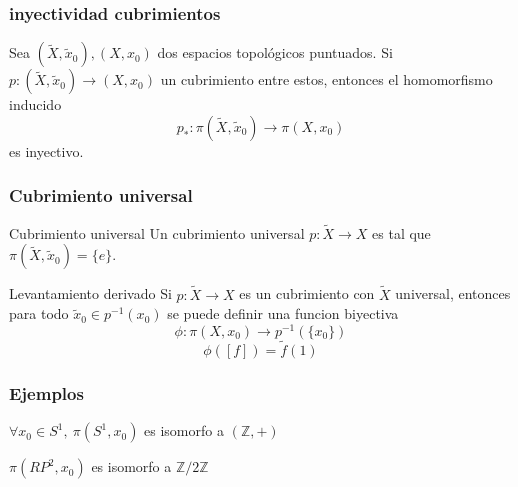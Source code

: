 \documentclass[xetex,mathserif,serif]{beamer}
\begin{document}
  \begin{frame}
    \frametitle{inyectividad cubrimientos}
    \begin{block}{}
      Sea \(\left( \tilde X, \tilde x_0 \right), \left( X, x_0 \right)\)
      dos espacios topológicos puntuados. Si \(p : \left( \tilde X,
        \tilde x_0 \right) \to \left( X, x_0 \right)\) un cubrimiento
      entre estos, entonces el homomorfismo inducido
      \[ p_* : \pi \left( \tilde X, \tilde x_0 \right) \longrightarrow
        \pi \left( X, x_0 \right)\] es inyectivo.
    \end{block}
  \end{frame}

  \begin{frame}
    \frametitle{Cubrimiento universal}
    \begin{block}{Cubrimiento universal}
      Un cubrimiento universal \(p : \tilde X \to X\) es tal que \(\pi
      (\tilde X, \tilde x_0) = \{e\}\).
    \end{block}

    \begin{block}{Levantamiento derivado}
      Si \(p : \tilde X \to X\) es un cubrimiento con \(\tilde X\)
      universal, entonces para todo \(\tilde x_0 \in p^{-1} (x_0)\) se
      puede definir una funcion biyectiva
      \[ \phi : \pi (X, x_0) \to p^{-1} (\{x_0\}) \]
      \[ \phi \left( [f] \right) = \tilde f (1) \]
    \end{block}
  \end{frame}

  \begin{frame}
    \frametitle{Ejemplos}
    \begin{block}{}
        \(\forall x_0 \in S^1,\ \pi (S^1,x_0)\) es isomorfo a \((\mathbb
          Z, +)\)
    \end{block}

    \begin{block}{}
      \(\pi (RP^2, x_0)\) es isomorfo a \(\mathbb Z / 2 \mathbb Z\)
    \end{block}
  \end{frame}
\end{document}
